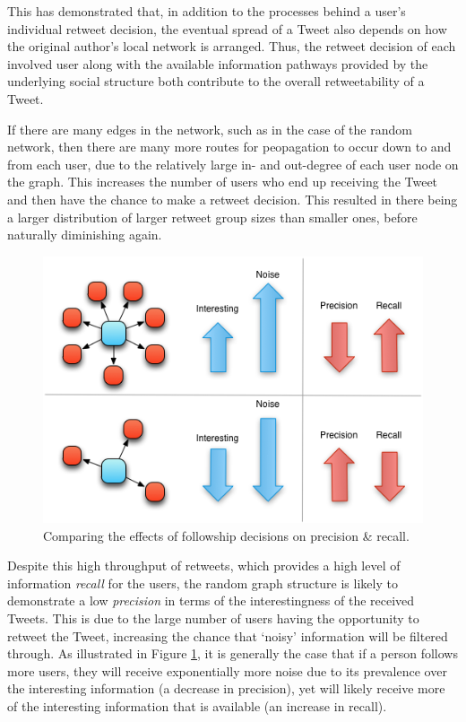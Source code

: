 This has demonstrated that, in addition to the processes behind a user's individual retweet decision, the eventual spread of a Tweet also depends on how the original author's local network is arranged. Thus, the retweet decision of each involved user along with the available information pathways provided by the underlying social structure both contribute to the overall retweetability of a Tweet. 

If there are many edges in the network, such as in the case of the random network, then there are many more routes for peopagation to occur down to and from each user, due to the relatively large in- and out-degree of each user node on the graph. This increases the number of users who end up receiving the Tweet and then have the chance to make a retweet decision. This resulted in there being a larger distribution of larger retweet group sizes than smaller ones, before naturally diminishing again. 

\begin{figure}[h]
\centering
\includegraphics[scale=0.8]{4.Chapter2/Media/precision_recall.png} 
\caption{Comparing the effects of followship decisions on precision \& recall.}
\label{fig:precision_recall}
\end{figure}

Despite this high throughput of retweets, which provides a high level of information \textit{recall} for the users, the random graph structure is likely to demonstrate a low \textit{precision} in terms of the interestingness of the received Tweets. This is due to the large number of users having the opportunity to retweet the Tweet, increasing the chance that `noisy' information will be filtered through. As illustrated in Figure \ref{fig:precision_recall}, it is generally the case that if a person follows more users, they will receive exponentially more noise due to its prevalence over the interesting information (a decrease in precision), yet will likely receive more of the interesting information that is available (an increase in recall).

